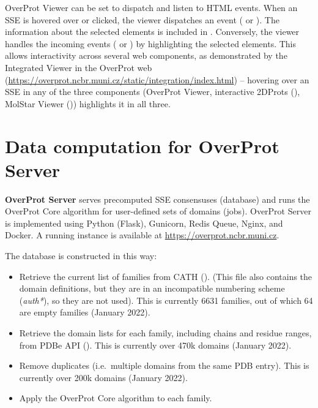 \documentclass{article}
\begin{document}
OverProt Viewer can be set to dispatch and listen to HTML events. 
When an SSE is hovered over or clicked, the viewer dispatches an event ( or ). 
The information about the selected elements is included in .
Conversely, the viewer handles the incoming events ( 
or ) by highlighting the selected elements. 
This allows interactivity across several web components, as demonstrated by 
the Integrated Viewer in the OverProt web 
(\url{https://overprot.ncbr.muni.cz/static/integration/index.html})
-- hovering over an SSE in any of the three components (OverProt Viewer, 
interactive 2DProts (), 
MolStar Viewer ()) highlights it in all three.





\section{Data computation for OverProt Server}

\textbf{OverProt Server} serves precomputed SSE consensuses (database)
and runs the OverProt Core algorithm for user-defined sets of domains (jobs). 
OverProt Server is implemented using Python (Flask), Gunicorn, Redis Queue, Nginx, and Docker.
A running instance is available at \url{https://overprot.ncbr.muni.cz}.


The database is constructed in this way:

\begin{itemize}
\item
  Retrieve the current list of families from CATH
  ().
  (This file also contains the domain definitions, but they are in an
  incompatible numbering scheme (\emph{auth*}), so they are not
  used). This is currently 6631 families, out of which 64 are empty
  families (January 2022).
\item
  Retrieve the domain lists for each family, including chains and
  residue ranges, from PDBe API
  (). This is
  currently over 470k domains (January 2022).
\item
  Remove duplicates (i.e.~multiple domains from the same PDB entry).
  This is currently over 200k domains (January 2022).
\item
  Apply the OverProt Core algorithm to each family.
\end{itemize}
\end{document}
